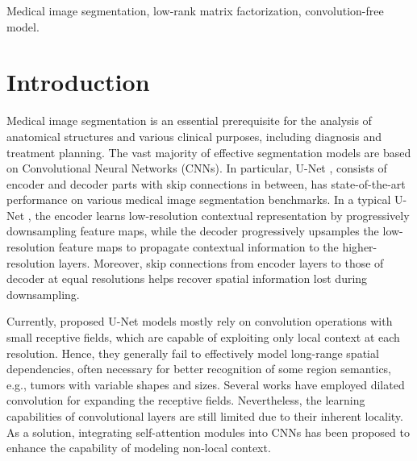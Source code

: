\documentclass[a4,12pt]{article}
\begin{document}
	\begin{keywords}
		Medical image segmentation, low-rank matrix factorization, convolution-free model.
	\end{keywords}
	
	\section{Introduction} \label{sec: introduction}
	
	Medical image segmentation is an essential prerequisite for the analysis of anatomical structures and various clinical purposes, including diagnosis and treatment planning. The vast majority of effective segmentation models are based on Convolutional Neural Networks (CNNs). In particular, U-Net \citep{ronneberger2015u}, consists of encoder and decoder parts with skip connections in between, has state-of-the-art performance on various medical image segmentation benchmarks. In a typical U-Net \citep{ronneberger2015u, cciccek20163d}, the encoder learns low-resolution contextual representation by progressively downsampling feature maps, while the decoder progressively upsamples the low-resolution feature maps to propagate contextual information to the higher-resolution layers. Moreover, skip connections from encoder layers to those of decoder at equal resolutions helps recover spatial information lost during downsampling.
	
	Currently, proposed U-Net models mostly rely on convolution operations with small receptive fields, which are capable of exploiting only local context at each resolution. Hence, they generally fail to effectively model long-range spatial dependencies, often necessary for better recognition of some region semantics, e.g., tumors with variable shapes and sizes. Several works \citep{chen2017deeplab, gu2019net} have employed dilated convolution for expanding the receptive fields. Nevertheless, the learning capabilities of convolutional layers are still limited due to their inherent locality. As a solution, integrating self-attention modules into CNNs \citep{wang2018non, fu2019dual} has been proposed to enhance the capability of modeling non-local context.
	
\end{document}
